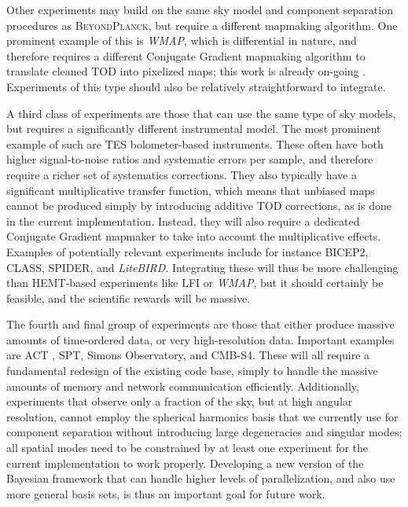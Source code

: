 \documentclass[twocolumn]{aa}
\def\WMAP{\emph{WMAP}}
\newcommand{\BP}{\textsc{BeyondPlanck}}
\begin{document}
Other experiments may build on the same sky model and component
separation procedures as \BP, but require a different mapmaking
algorithm. One prominent example of this is \WMAP, which is
differential in nature, and therefore requires a different Conjugate
Gradient mapmaking algorithm to translate cleaned TOD into pixelized
maps; this work is already on-going \citep{bp17}. Experiments of this type should
also be relatively straightforward to integrate.

A third class of experiments are those that can use the same type of
sky models, but requires a significantly different instrumental
model. The most prominent example of such are TES bolometer-based
instruments. These often have both higher signal-to-noise ratios and
systematic errors per sample, and therefore require a richer set of
systematics corrections. They also typically have a significant
multiplicative transfer function, which means that unbiased maps
cannot be produced simply by introducing additive TOD corrections, as
is done in the current implementation.  Instead, they will also require
a dedicated Conjugate Gradient mapmaker to take into account the
multiplicative effects. Examples of potentially relevant experiments
include for instance BICEP2, CLASS, SPIDER, and \emph{LiteBIRD}. Integrating
these will thus be more challenging than HEMT-based experiments like
LFI or \WMAP, but it should certainly be feasible, and the scientific
rewards will be massive.

The fourth and final group of experiments are those that either
produce massive amounts of time-ordered data, or very high-resolution
data. Important examples are ACT , SPT, Simons Observatory, and CMB-S4. 
These will all require a fundamental redesign of the existing
code base, simply to handle the massive amounts of
memory and network communication efficiently. Additionally,
experiments that observe only a fraction of the sky, but at high
angular resolution, cannot employ the spherical harmonics basis that
we currently use for component separation without introducing large
degeneracies and singular modes; all spatial modes need to be
constrained by at least one experiment for the current implementation
to work properly. Developing a new version of the Bayesian framework
that can handle higher levels of parallelization, and also use more
general basis sets, is thus an important goal for future work.
\end{document}
